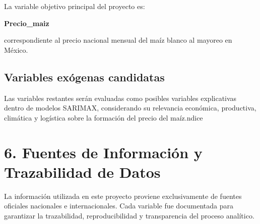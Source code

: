 \documentclass[11pt]{article}
\begin{document}
La variable objetivo principal del proyecto es:

\textbf{Precio\_maiz}

correspondiente al precio nacional mensual del maíz blanco al mayoreo en
México.

\hypertarget{variables-exuxf3genas-candidatas}{%
\subsection{Variables exógenas
candidatas}\label{variables-exuxf3genas-candidatas}}

Las variables restantes serán evaluadas como posibles variables
explicativas dentro de modelos SARIMAX, considerando su relevancia
económica, productiva, climática y logística sobre la formación del
precio del maíz.ndice \textbar{}

    \hypertarget{fuentes-de-informaciuxf3n-y-trazabilidad-de-datos}{%
\section{6. Fuentes de Información y Trazabilidad de
Datos}\label{fuentes-de-informaciuxf3n-y-trazabilidad-de-datos}}

La información utilizada en este proyecto proviene exclusivamente de
fuentes oficiales nacionales e internacionales. Cada variable fue
documentada para garantizar la trazabilidad, reproducibilidad y
transparencia del proceso analítico.
\end{document}
